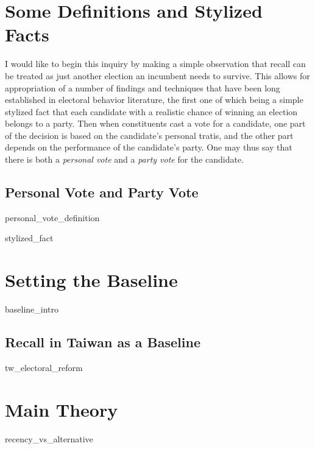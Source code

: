 \documentclass[hyphens, crop=false]{standalone}
\begin{document}
	
	\section*{Some Definitions and Stylized Facts}
		I would like to begin this inquiry by making a simple observation that
		recall can be treated as just another election
		an incumbent needs to survive.
		This allows for appropriation of a number of findings and techniques
		that have been long established in electoral behavior literature,
		the first one of which being a simple stylized fact that
		each candidate with a realistic chance of winning an election belongs to a party.
		Then when constituents cast a vote for a candidate,
		one part of the decision is based on the candidate's personal tratis,
		and the other part depends on the performance of the candidate's party. 
		One may thus say that there is both
		a \textit{personal vote}
		and a \textit{party vote} for the candidate.
	
		\subsection*{Personal Vote and Party Vote}
			{personal_vote_definition}
			
			{stylized_fact}
				
	\section*{Setting the Baseline}
		
		{baseline_intro}
		
		
		\subsection*{Recall in Taiwan as a Baseline}
		
			{tw_electoral_reform}
			
			
	
	\section*{Main Theory}
	
	
	{recency_vs_alternative}
	
\end{document}
